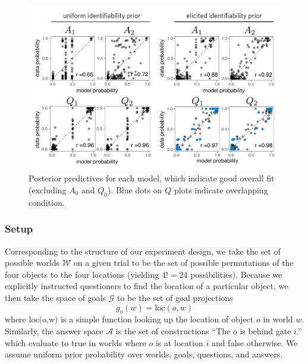\documentclass[11pt, floatsintext]{apa6}
\begin{document}
\begin{figure}[tbh!]
\begin{center}
\includegraphics[scale = .77]{Exp1/ResultsFig.pdf}
\end{center}
\caption{Posterior predictives for each model, which indicate good overall fit (excluding $A_0$ and $Q_0$). Blue dots on $Q$ plots indicate overlapping condition.}
\label{fig:exp1predictives}
\end{figure}


\subsubsection{Setup} 
Corresponding to the structure of our experiment design, we take the set of possible worlds $\mathcal{W}$ on a given trial to be the set of possible permutations of the four objects to the four locations (yielding $4! = 24$ possibilities). 
Because we explicitly instructed questioners to find the location of a particular object, we then take the space of goals $\mathcal{G}$ to be the set of goal projections $$g_o(w) = \textrm{loc}(o,w)$$ where $\textrm{loc(o,w)}$ is a simple function looking up the location of object $o$ in world $w$. 
Similarly, the answer space $\mathcal{A}$ is the set of constructions ``The $o$ is behind gate $i$.'' which evaluate to true in worlds where $o$ is at location $i$ and false otherwise.
We assume uniform prior probability over worlds, goals, questions, and answers. 
\end{document}
